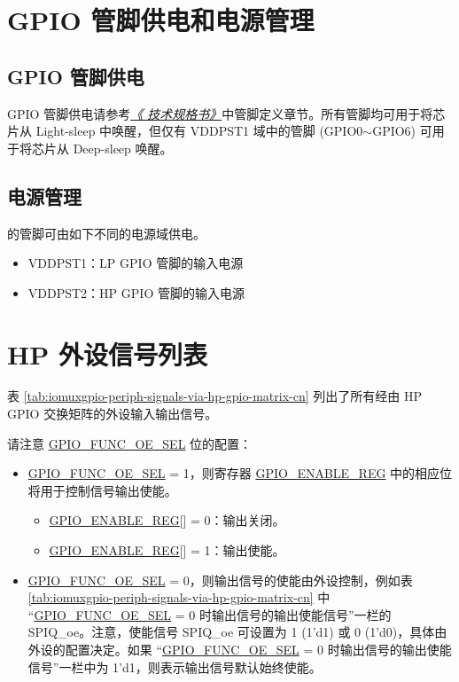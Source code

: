 \documentclass[main\_\_CN.tex]{subfiles}
\begin{document}
\section{GPIO 管脚供电和电源管理}\label{I/O Pad Power Supplies}

\subsection{GPIO 管脚供电}
GPIO 管脚供电请参考\textit{\href{https://www.espressif.com/sites/default/files/documentation/esp32-c5_datasheet_en.pdf}{《\chipname{} 技术规格书》}}中管脚定义章节。所有管脚均可用于将芯片从 Light-sleep 中唤醒，但仅有 VDDPST1 域中的管脚 (GPIO0$\sim$GPIO6) 可用于将芯片从 Deep-sleep 唤醒。

\subsection{电源管理}

 \chipname{} 的管脚可由如下不同的电源域供电。

\begin{itemize}
    \item VDDPST1：LP GPIO 管脚的输入电源
    \item VDDPST2：HP GPIO 管脚的输入电源
\end{itemize}

\section{HP 外设信号列表}
\label{sec:hp_peripheral_signals}

表 \ref{tab:iomuxgpio-periph-signals-via-hp-gpio-matrix-cn} 列出了所有经由 HP GPIO 交换矩阵的外设输入输出信号。

请注意 \hyperref[fielddesc:GPIOFUNCNOESEL]{GPIO\_FUNC\_OE\_SEL} 位的配置：

\begin{itemize}
    \item \hyperref[fielddesc:GPIOFUNCNOESEL]{GPIO\_FUNC\_OE\_SEL} = 1，则寄存器 \hyperref[regdesc:GPIOENABLEREG]{GPIO\_ENABLE\_REG} 中的相应位  将用于控制信号输出使能。

    \begin{itemize}
        \item \hyperref[regdesc:GPIOENABLEREG]{GPIO\_ENABLE\_REG}[] = 0：输出关闭。
        \item \hyperref[regdesc:GPIOENABLEREG]{GPIO\_ENABLE\_REG}[] = 1：输出使能。
    \end{itemize}
    \item \hyperref[fielddesc:GPIOFUNCNOESEL]{GPIO\_FUNC\_OE\_SEL} = 0，则输出信号的使能由外设控制，例如表 \ref{tab:iomuxgpio-periph-signals-via-hp-gpio-matrix-cn} 中 “\hyperref[fielddesc:GPIOFUNCNOESEL]{GPIO\_FUNC\_OE\_SEL} = 0 时输出信号的输出使能信号”一栏的 SPIQ\_oe。注意，使能信号 SPIQ\_oe 可设置为 1 (1'd1) 或 0 (1'd0)，具体由外设的配置决定。如果 “\hyperref[fielddesc:GPIOFUNCNOESEL]{GPIO\_FUNC\_OE\_SEL} = 0 时输出信号的输出使能信号”一栏中为 1'd1，则表示输出信号默认始终使能。
\end{itemize}
\end{document}
